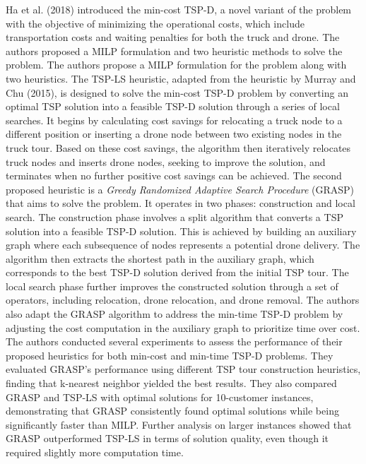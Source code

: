 \documentclass{article}
\begin{document}
	Ha et al. (2018) \cite{Ha2018} introduced the min-cost TSP-D, a novel variant of the problem with the objective of minimizing the operational costs, which include transportation costs and waiting penalties for both the truck and drone. The authors proposed a MILP formulation and two heuristic methods to solve the problem. The authors propose a MILP formulation for the problem along with two heuristics. The TSP-LS heuristic, adapted from the heuristic by Murray and Chu (2015), is designed to solve the min-cost TSP-D problem by converting an optimal TSP solution into a feasible TSP-D solution through a series of local searches. It begins by calculating cost savings for relocating a truck node to a different position or inserting a drone node between two existing nodes in the truck tour. Based on these cost savings, the algorithm then iteratively relocates truck nodes and inserts drone nodes, seeking to improve the solution, and terminates when no further positive cost savings can be achieved. The second proposed heuristic is a \textit{Greedy Randomized Adaptive Search Procedure} (GRASP) that aims to solve the problem. It operates in two phases: construction and local search. The construction phase involves a split algorithm that converts a TSP solution into a feasible TSP-D solution. This is achieved by building an auxiliary graph where each subsequence of nodes represents a potential drone delivery. The algorithm then extracts the shortest path in the auxiliary graph, which corresponds to the best TSP-D solution derived from the initial TSP tour. The local search phase further improves the constructed solution through a set of operators, including relocation, drone relocation, and drone removal. The authors also adapt the GRASP algorithm to address the min-time TSP-D problem by adjusting the cost computation in the auxiliary graph to prioritize time over cost. The authors conducted several experiments to assess the performance of their proposed heuristics for both min-cost and min-time TSP-D problems. They evaluated GRASP's performance using different TSP tour construction heuristics, finding that k-nearest neighbor yielded the best results. They also compared GRASP and TSP-LS with optimal solutions for 10-customer instances, demonstrating that GRASP consistently found optimal solutions while being significantly faster than MILP. Further analysis on larger instances showed that GRASP outperformed TSP-LS in terms of solution quality, even though it required slightly more computation time. 
\end{document}
